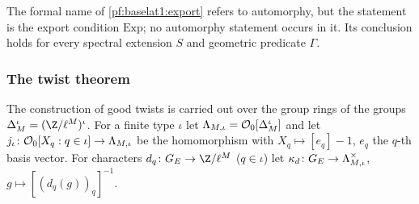 \begin{remark}\label{pf:baselat1:rem:export}
The formal name of \cref{pf:baselat1:export} refers to automorphy, but the statement is the export condition
$\mathrm{Exp}$; no automorphy statement occurs in it. Its conclusion holds for every spectral extension $S$ and
geometric predicate $\Gamma$.
\end{remark}

\subsubsection{The twist theorem}

The construction of good twists is carried out over the group rings of the groups
$\Delta_M^\iota=(\Z/\ell^M)^\iota$. For a finite type $\iota$ let
$\Lambda_{M,\iota}=\mathcal O_0[\Delta_M^\iota]$ and let
$j_\iota\colon\mathcal O_0[X_q:q\in\iota]\to\Lambda_{M,\iota}$ be the homomorphism with
$X_q\mapsto[e_q]-1$, $e_q$ the $q$-th basis vector. For characters $d_q\colon G_E\to\Z/\ell^M$ ($q\in\iota$) let
$\kappa_d\colon G_E\to\Lambda_{M,\iota}^\times$, $g\mapsto[(d_q(g))_q]^{-1}$.

